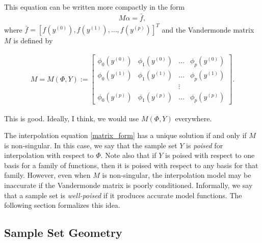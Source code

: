 \documentclass{article}
\begin{document}
This equation can be written more compactly in the form
\begin{align}
\label{matrix_form}
M \alpha = \bar{f},
\end{align}
where $\bar{f} = [f\left(y^{(0)}\right), f\left(y^{(1)}\right), \ldots, f\left(y^{(p)}\right)]^T$ and the Vandermonde matrix $M$ is defined by

\begin{align}
\label{vandermonde}
M=M(\Phi,Y) :=
\begin{bmatrix}
    \phi_0\left(y^{(0)}\right)      & \phi_1\left(y^{(0)}\right)       & \ldots & \phi_{p}\left(y^{(0)}\right)      \\
    \phi_0\left(y^{(1)}\right)      & \phi_1\left(y^{(1)}\right)       & \dots  & \phi_{p}\left(y^{(1)}\right)      \\
                     &                   & \vdots &                    \\
    \phi_0\left(y^{(p)}\right)    & \phi_1\left(y^{(p)}\right)     & \ldots & \phi_{p}\left(y^{{(p)}}\right)
\end{bmatrix}.
\end{align}


\color{magenta}
This is good. Ideally, I think, we would use $M\left(\Phi, Y\right)$ everywhere.
\color{black}

The interpolation equation \cref{matrix_form} has a unique solution if and only if $M$ is non-singular. 
In this case, we say that the sample set $Y$ is \emph{poised} for interpolation with respect to $\Phi$.   Note also that if $Y$ is poised with respect to one basis for a family of functions, then it is poised with respect to any basis for that family.     
However, even when $M$ is non-singular,  the interpolation model may be inaccurate if the Vandermonde matrix is poorly conditioned.   Informally,  we say that a sample set is {\em well-poised} if it produces accurate model functions.  The following section formalizes this idea.

\subsection{Sample Set Geometry}
\end{document}
